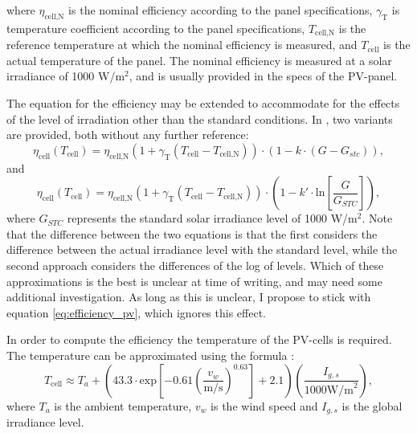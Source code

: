 where $\eta_{\text{cell,N}} $ is the nominal efficiency according to the panel specifications, $\gamma_{\text{T}}$ is temperature coefficient according to the panel specifications, $T_{\text{cell,N}}$ is the reference temperature at which the nominal efficiency is measured, and $T_{\text{cell}}$ is the actual temperature of the panel. The nominal efficiency is measured at a solar irradiance of 1000 W/$\text{m}^2$, and is usually provided in the specs of the PV-panel. 

The equation for the efficiency may be extended to accommodate for the effects of the level of irradiation other than the standard conditions. In \cite{SHC2020PVT}, two variants are provided, both without any further reference:
\begin{equation}
  \eta_{\text{cell}}(T_{\text{cell}}) = \eta_{\text{cell,N}} \left( 1 + \gamma_{\text{T}}\left(T_{\text{cell}} - T_{\text{cell,N}} \right) \right)\cdot (1-k\cdot(G - G_{stc})),
\end{equation}
and
\begin{equation}
  \eta_{\text{cell}}(T_{\text{cell}}) = \eta_{\text{cell,N}} \left( 1 + \gamma_{\text{T}}\left(T_{\text{cell}} - T_{\text{cell,N}} \right) \right)\cdot \left(1-k'\cdot \text{ln}\left[\frac{G}{G_{STC}}\right] \right),
\end{equation}
where $G_{STC}$ represents the standard solar irradiance level of 1000 W/$\text{m}^2$. Note that the difference between the two equations is that the first considers the difference between the actual irradiance level with the standard level, while the second approach considers the differences of the log of levels. Which of these approximations is the best is unclear at time of writing, and may need some additional investigation. As long as this is unclear, I propose to stick with equation \ref{eq:efficiency_pv}, which ignores this effect. 


In order to compute the efficiency the temperature of the PV-cells is required. The temperature can be approximated using the formula \cite{VanderSluys2021}:
\begin{equation}
	T_{\text{cell}} \approx T_a + \left( 43.3 \cdot \text{exp} \left[-0.61 \left(\frac{v_w}{\text{m/s}} \right)^{0.63} \right] + 2.1 \right)\left(\frac{I_{g,s}}{1000\text{W/m}^2} \right), 
\label{eq:temp_panel}
\end{equation}
where $T_a$ is the ambient temperature, $v_w$ is the wind speed and $I_{g,s}$ is the global irradiance level. 



